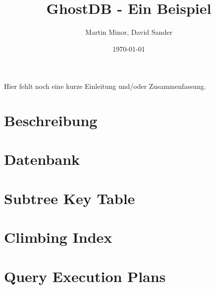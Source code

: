 \documentclass[a4paper, pdftex, notitlepage, parskip]{scrreprt}
\begin{document}
\title{\vspace{2cm} \Huge GhostDB - Ein Beispiel \vspace{2cm}}
\author{Martin Minor, David Sander}
\date{\today}
\maketitle
\vspace{2cm}
%
Hier fehlt noch eine kurze Einleitung und/oder Zusammenfassung.
%
\tableofcontents
\listoffigures
\listoftables
\pagestyle{headings}
%
\chapter{Beschreibung}

\chapter{Datenbank}

\chapter{Subtree Key Table}

\chapter{Climbing Index}

\chapter{Query Execution Plans}\label{chp:Query Execution Plans}



%
\end{document}
